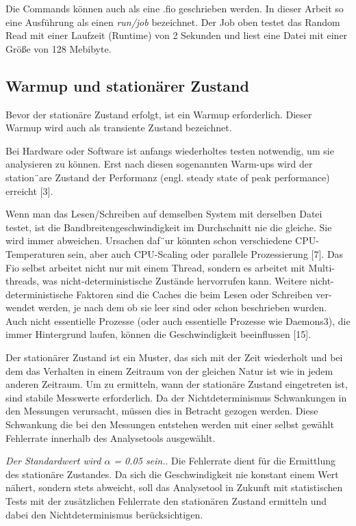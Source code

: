 Die Commands können auch als eine .fio geschrieben werden. In dieser Arbeit so eine Ausführung als einen \textit{run/job} bezeichnet.
Der Job oben testet das Random Read mit einer Laufzeit (Runtime) von 2 Sekunden und liest eine Datei mit einer Größe von 128 Mebibyte.

\subsection{Warmup und stationärer Zustand}

Bevor der stationäre Zustand erfolgt, ist ein Warmup erforderlich.
Dieser Warmup wird auch als transiente Zustand bezeichnet.

Bei Hardware oder Software ist anfangs wiederholtes testen notwendig, um
sie analysieren zu können. Erst nach diesen sogenannten Warm-ups wird der
station¨are Zustand der Performanz (engl. steady state of peak performance)
erreicht [3].

Wenn man das Lesen/Schreiben auf demselben System mit derselben Datei
testet, ist die Bandbreitengeschwindigkeit im Durchschnitt nie die gleiche. Sie
wird immer abweichen. Ursachen daf¨ur könnten schon verschiedene CPU-Temperaturen sein, 
aber auch CPU-Scaling oder parallele Prozessierung [7]. Das Fio
selbst arbeitet nicht nur mit einem Thread, sondern es arbeitet mit Multi-
threads, was nicht-deterministische Zustände hervorrufen kann. Weitere nicht-
deterministische Faktoren sind die Caches die beim Lesen oder Schreiben ver-
wendet werden, je nach dem ob sie leer sind oder schon beschrieben wurden.
Auch nicht essentielle Prozesse (oder auch essentielle Prozesse wie Daemons3),
die immer Hintergrund laufen, können die Geschwindigkeit beeinflussen [15].

Der stationärer Zustand ist ein Muster, das sich mit der Zeit wiederholt und bei dem das Verhalten in einem Zeitraum von der 
gleichen Natur ist wie in jedem anderen Zeitraum. Um zu ermitteln,
wann der stationäre Zustand eingetreten ist, sind stabile Messwerte erforderlich.
Da der Nichtdeterminismus Schwankungen in den Messungen verursacht, müssen dies in Betracht gezogen werden.
Diese Schwankung die bei den Messungen entstehen werden mit einer selbst gewählt Fehlerrate innerhalb des Analysetools ausgewählt.

\textit{Der Standardwert wird $\alpha$ = 0.05 sein.}. Die Fehlerrate dient für die Ermittlung des stationäre Zustandes.
Da sich die Geschwindigkeit nie konstant einem Wert nähert, sondern stets
abweicht, soll das Analysetool in Zukunft mit statistischen Tests mit der zusätzlichen Fehlerrate den stationären
Zustand ermitteln und dabei den Nichtdeterminismus berücksichtigen.

